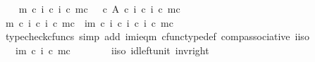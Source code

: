 \begin{isabellebody}
\isanewline
\ \ \isamarkupfalse%
\ {\isachardoublequoteopen}{\isasymchi}m\ {\isasymcirc}\isactrlsub c\ {\isacharparenleft}{\kern0pt}i\isactrlbold {\isasyminverse}\ {\isasymcirc}\isactrlsub c\ {\isacharparenleft}{\kern0pt}i\ {\isasymcirc}\isactrlsub c\ m{\isacharparenright}{\kern0pt}\isactrlsup c{\isacharparenright}{\kern0pt}\ {\isacharequal}{\kern0pt}\ {\isasymf}\ {\isasymcirc}\isactrlsub c\ {\isasymbeta}\isactrlbsub A\isactrlesub \ {\isasymcirc}\isactrlsub c\ {\isacharparenleft}{\kern0pt}i\isactrlbold {\isasyminverse}\ {\isasymcirc}\isactrlsub c\ {\isacharparenleft}{\kern0pt}i\ {\isasymcirc}\isactrlsub c\ m{\isacharparenright}{\kern0pt}\isactrlsup c{\isacharparenright}{\kern0pt}{\isachardoublequoteclose}\isanewline
\ \ \isamarkupfalse%
\ {\isacharminus}{\kern0pt}\isanewline
\ \ \ \ \isamarkupfalse%
\ {\isachardoublequoteopen}{\isasymchi}m\ {\isasymcirc}\isactrlsub c\ {\isacharparenleft}{\kern0pt}i\isactrlbold {\isasyminverse}\ {\isasymcirc}\isactrlsub c\ {\isacharparenleft}{\kern0pt}i\ {\isasymcirc}\isactrlsub c\ m{\isacharparenright}{\kern0pt}\isactrlsup c{\isacharparenright}{\kern0pt}\ {\isacharequal}{\kern0pt}\ {\isasymchi}im\ {\isasymcirc}\isactrlsub c\ {\isacharparenleft}{\kern0pt}i\ {\isasymcirc}\isactrlsub c\ i\isactrlbold {\isasyminverse}{\isacharparenright}{\kern0pt}\ {\isasymcirc}\isactrlsub c\ {\isacharparenleft}{\kern0pt}i\ {\isasymcirc}\isactrlsub c\ m{\isacharparenright}{\kern0pt}\isactrlsup c{\isachardoublequoteclose}\isanewline
\ \ \ \ \ \ \isamarkupfalse%
\ {\isacharparenleft}{\kern0pt}typecheck{\isacharunderscore}{\kern0pt}cfuncs{\isacharcomma}{\kern0pt}\ simp\ add{\isacharcolon}{\kern0pt}\ {\isasymchi}im{\isacharunderscore}{\kern0pt}i{\isacharunderscore}{\kern0pt}eq{\isacharunderscore}{\kern0pt}{\isasymchi}m\ cfunc{\isacharunderscore}{\kern0pt}type{\isacharunderscore}{\kern0pt}def\ comp{\isacharunderscore}{\kern0pt}associative\ i{\isacharunderscore}{\kern0pt}iso{\isacharparenright}{\kern0pt}\isanewline
\ \ \ \ \isamarkupfalse%
\ \isamarkupfalse%
\ {\isachardoublequoteopen}{\isachardot}{\kern0pt}{\isachardot}{\kern0pt}{\isachardot}{\kern0pt}\ {\isacharequal}{\kern0pt}\ {\isasymchi}im\ {\isasymcirc}\isactrlsub c\ {\isacharparenleft}{\kern0pt}i\ {\isasymcirc}\isactrlsub c\ m{\isacharparenright}{\kern0pt}\isactrlsup c{\isachardoublequoteclose}\isanewline
\ \ \ \ \ \ \isamarkupfalse%
\ i{\isacharunderscore}{\kern0pt}iso\ id{\isacharunderscore}{\kern0pt}left{\isacharunderscore}{\kern0pt}unit{}\ inv{\isacharunderscore}{\kern0pt}right\ \isamarkupfalse%

\end{isabellebody}

